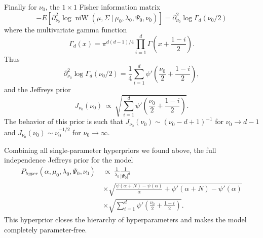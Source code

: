 \documentclass[11pt, oneside]{article}   	%
\DeclareMathOperator{\niW}{niW}
\begin{document}
Finally for $\nu_0$, the $1\times 1$ Fisher information matrix
$$-E\left[\partial^2_{\nu_0}\log \niW(\mu,\Sigma~\vert~\mu_0,\lambda_0,\Psi_0,\nu_0)\right] = \partial^2_{\nu_0}\log\Gamma_d(\nu_0/2)$$
where the multivariate gamma function
$$\Gamma_d(x) = \pi^{d(d-1)/4}\prod_{i=1}^d\Gamma\left(x + \frac{1 - i}{2}\right).$$
Thus
$$\partial^2_{\nu_0}\log\Gamma_d(\nu_0/2) = \frac{1}{4}\sum_{i=1}^d \psi'\left(\frac{\nu_0}{2} + \frac{1 - i}{2}\right),$$
and the Jeffreys prior
$$J_{\nu_0}(\nu_0)~\propto~\sqrt{\sum_{i=1}^d \psi'\left(\frac{\nu_0}{2} + \frac{1 - i}{2}\right)}.$$
The behavior of this prior is such that $J_{\nu_0}(\nu_0) \sim (\nu_0 - d + 1)^{-1}$ for $\nu_0 \rightarrow d - 1$ and $J_{\nu_0}(\nu_0) \sim \nu_0^{-1/2}$ for $\nu_0\rightarrow\infty$.

Combining all single-parameter hyperpriors we found above, the full independence Jeffreys prior for the model
\begin{equation}\begin{split}
P_{hyper}(\alpha,\mu_0,\lambda_0,\Psi_0,\nu_0)~&\propto~\frac{1}{\lambda_0}\frac{1}{\vert\Psi_0\vert^d} \\
&\times \sqrt{\frac{\psi(\alpha + N) - \psi(\alpha)}{\alpha} + \psi'(\alpha +N) - \psi'(\alpha)}\\
&\times \sqrt{\sum_{i=1}^d \psi'\left(\frac{\nu_0}{2} + \frac{1 - i}{2}\right)}.
\end{split}\end{equation}
This hyperprior closes the hierarchy of hyperparameters and makes the model completely parameter-free.
\end{document}
